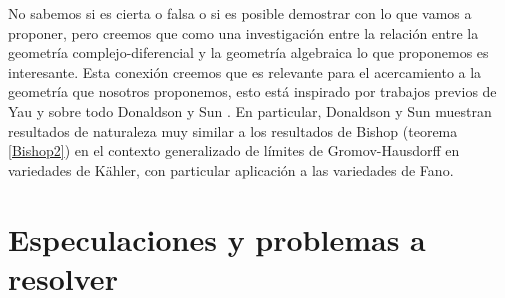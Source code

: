 \documentclass{article}
\begin{document}
\noindent No sabemos si es cierta o falsa o si es posible demostrar con lo que vamos a proponer, pero creemos que como una 
investigaci\'on entre la relaci\'on entre la geometr\'ia complejo-diferencial y la geometr\'ia algebraica lo que proponemos es interesante. 
Esta conexi\'on creemos que es relevante para el acercamiento a la geometr\'ia que nosotros proponemos, esto est\'a inspirado por trabajos 
previos de Yau \cite{S-Yau} y sobre todo Donaldson y Sun \cite{D-SS}. En particular, Donaldson y Sun muestran resultados de naturaleza muy similar 
a los resultados de Bishop (teorema \ref{Bishop2}) en el contexto generalizado de l\'imites de Gromov-Hausdorff en variedades de 
K\"ahler, con particular aplicaci\'on a las variedades de Fano.

\section{Especulaciones y problemas a resolver}
\end{document}
